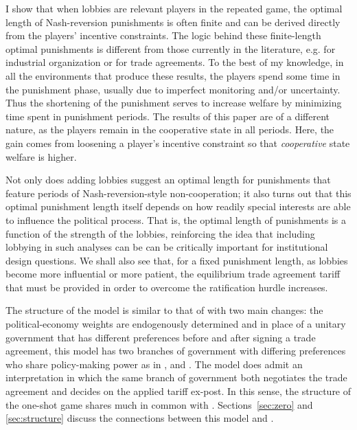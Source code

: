 \documentclass[authoryear, review]{elsarticle}
\begin{document}
I show that when lobbies are relevant players in the repeated game, the optimal length of Nash-reversion punishments is often finite and can be derived directly from the players' incentive constraints. The logic behind these finite-length optimal punishments is different from those currently in the literature, e.g. \citet{greenporter} for industrial organization or \citet{park} for trade agreements. To the best of my knowledge, in all the environments that produce these results, the players spend some time in the punishment phase, usually due to imperfect monitoring and/or uncertainty. Thus the shortening of the punishment serves to increase welfare by minimizing time spent in punishment periods. The results of this paper are of a different nature, as the players remain in the cooperative state in all periods. Here, the gain comes from loosening a player's incentive constraint so that \textit{cooperative} state welfare is higher.

Not only does adding lobbies suggest an optimal length for punishments that feature periods of Nash-reversion-style non-cooperation; it also turns out that this optimal punishment length itself depends on how readily special interests are able to influence the political process. That is, the optimal length of punishments is a function of the strength of the lobbies, reinforcing the idea that including lobbying in such analyses can be can be critically important for institutional design questions. We shall also see that, for a fixed punishment length, as lobbies become more influential or more patient, the equilibrium trade agreement tariff that must be provided in order to overcome the ratification hurdle increases. 

The structure of the model is similar to that of \citet{bs2005} with two main changes: the political-economy weights are endogenously determined and in place of a unitary government that has different preferences before and after signing a trade agreement, this model has two branches of government with differing preferences who share policy-making power as in \citet{mr97}, \citet{song} and \citet{buzard2013b}. The model does admit an interpretation in which the same branch of government both negotiates the trade agreement and decides on the applied tariff ex-post. In this sense, the structure of the one-shot game shares much in common with \citet{mrc2007}. Sections~\ref{sec:zero} and \ref{sec:structure} discuss the connections between this model and \citet{mrc2007}.
\end{document}
